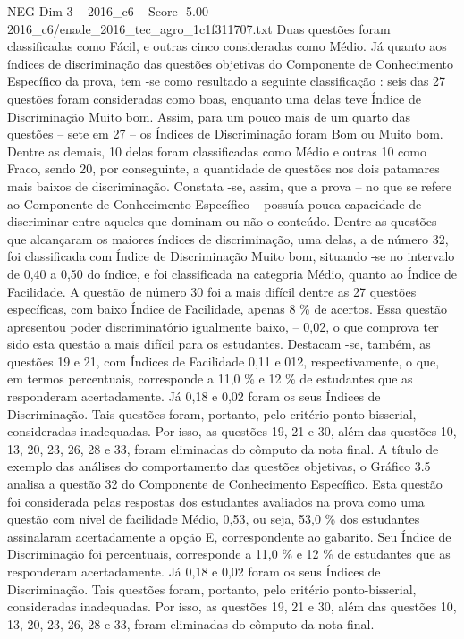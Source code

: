 \begin{textsample}{NEG Dim 3 – 2016\_c6 – Score -5.00 – 2016\_c6/enade\_2016\_tec\_agro\_1c1f311707.txt}
Duas questões foram classificadas como Fácil, e outras cinco consideradas como Médio.
Já quanto aos índices de discriminação das questões objetivas do Componente de Conhecimento Específico da prova, tem -se como resultado a seguinte classificação : seis das 27 questões foram consideradas como boas, enquanto uma delas teve Índice de Discriminação Muito bom.
Assim, para um pouco mais de um quarto das questões – sete em 27 – os Índices de Discriminação foram Bom ou Muito bom.
Dentre as demais, 10 delas foram classificadas como Médio e outras 10 como Fraco, sendo 20, por conseguinte, a quantidade de questões nos dois patamares mais baixos de discriminação.
Constata -se, assim, que a prova – no que se refere ao Componente de Conhecimento Específico – possuía pouca capacidade de discriminar entre aqueles que dominam ou não o conteúdo.
Dentre as questões que alcançaram os maiores índices de discriminação, uma delas, a de número 32, foi classificada com Índice de Discriminação Muito bom, situando -se no intervalo de 0,40 a 0,50 do índice, e foi classificada na categoria Médio, quanto ao Índice de Facilidade.
A questão de número 30 foi a mais difícil dentre as 27 questões específicas, com baixo Índice de Facilidade, apenas 8 \% de acertos.
Essa questão apresentou poder discriminatório igualmente baixo, – 0,02, o que comprova ter sido esta questão a mais difícil para os estudantes.
Destacam -se, também, as questões 19 e 21, com Índices de Facilidade 0,11 e 012, respectivamente, o que, em termos percentuais, corresponde a 11,0 \% e 12 \% de estudantes que as responderam acertadamente.
Já 0,18 e 0,02 foram os seus Índices de Discriminação.
Tais questões foram, portanto, pelo critério ponto-bisserial, consideradas inadequadas.
Por isso, as questões 19, 21 e 30, além das questões 10, 13, 20, 23, 26, 28 e 33, foram eliminadas do cômputo da nota final.
A título de exemplo das análises do comportamento das questões objetivas, o Gráfico 3.5 analisa a questão 32 do Componente de Conhecimento Específico.
Esta questão foi considerada pelas respostas dos estudantes avaliados na prova como uma questão com nível de facilidade Médio, 0,53, ou seja, 53,0 \% dos estudantes assinalaram acertadamente a opção E, correspondente ao gabarito.
Seu Índice de Discriminação foi percentuais, corresponde a 11,0 \% e 12 \% de estudantes que as responderam acertadamente.
Já 0,18 e 0,02 foram os seus Índices de Discriminação.
Tais questões foram, portanto, pelo critério ponto-bisserial, consideradas inadequadas.
Por isso, as questões 19, 21 e 30, além das questões 10, 13, 20, 23, 26, 28 e 33, foram eliminadas do cômputo da nota final.

\end{textsample}
